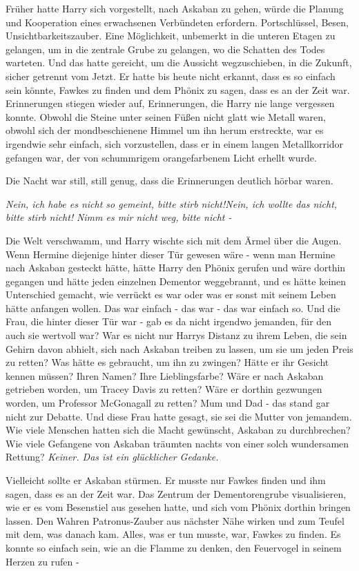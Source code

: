 Früher hatte Harry sich vorgestellt, nach Askaban zu gehen, würde die Planung
und Kooperation eines erwachsenen Verbündeten erfordern. Portschlüssel, Besen,
Unsichtbarkeitszauber. Eine Möglichkeit, unbemerkt in die unteren Etagen zu
gelangen, um in die zentrale Grube zu gelangen, wo die Schatten des Todes
warteten. Und das hatte gereicht, um die Aussicht wegzuschieben, in die Zukunft,
sicher getrennt vom Jetzt. Er hatte bis heute nicht erkannt, dass es so einfach
sein könnte, Fawkes zu finden und dem Phönix zu sagen, dass es an der Zeit war.
Erinnerungen stiegen wieder auf, Erinnerungen, die Harry nie lange vergessen
konnte. Obwohl die Steine unter seinen Füßen nicht glatt wie Metall waren,
obwohl sich der mondbeschienene Himmel um ihn herum erstreckte, war es irgendwie
sehr einfach, sich vorzustellen, dass er in einem langen Metallkorridor gefangen
war, der von schummrigem orangefarbenem Licht erhellt wurde.

Die Nacht war still, still genug, dass die Erinnerungen deutlich hörbar waren.

\emph{Nein, ich habe es nicht so gemeint, bitte stirb nicht!}\emph{Nein, ich
wollte das nicht, bitte stirb nicht!} \emph{Nimm es mir nicht weg, bitte nicht
-}

Die Welt verschwamm, und Harry wischte sich mit dem Ärmel über die Augen. Wenn
Hermine diejenige hinter dieser Tür gewesen wäre - wenn man Hermine nach Askaban
gesteckt hätte, hätte Harry den Phönix gerufen und wäre dorthin gegangen und
hätte jeden einzelnen Dementor weggebrannt, und es hätte keinen Unterschied
gemacht, wie verrückt es war oder was er sonst mit seinem Leben hätte anfangen
wollen. Das war einfach - das war - das war einfach so. Und die Frau, die hinter
dieser Tür war - gab es da nicht irgendwo jemanden, für den auch sie wertvoll
war? War es nicht nur Harrys Distanz zu ihrem Leben, die sein Gehirn davon
abhielt, sich nach Askaban treiben zu lassen, um sie um jeden Preis zu retten?
Was hätte es gebraucht, um ihn zu zwingen? Hätte er ihr Gesicht kennen müssen?
Ihren Namen? Ihre Lieblingsfarbe? Wäre er nach Askaban getrieben worden, um
Tracey Davis zu retten? Wäre er dorthin gezwungen worden, um Professor
McGonagall zu retten? Mum und Dad - das stand gar nicht zur Debatte. Und diese
Frau hatte gesagt, sie sei die Mutter von jemandem. Wie viele Menschen hatten
sich die Macht gewünscht, Askaban zu durchbrechen? Wie viele Gefangene von
Askaban träumten nachts von einer solch wundersamen Rettung?\emph{ Keiner. Das
ist ein glücklicher Gedanke.}

Vielleicht sollte er Askaban stürmen. Er musste nur Fawkes finden und ihm sagen,
dass es an der Zeit war. Das Zentrum der Dementorengrube visualisieren, wie er
es vom Besenstiel aus gesehen hatte, und sich vom Phönix dorthin bringen lassen.
Den Wahren Patronus-Zauber aus nächster Nähe wirken und zum Teufel mit dem, was
danach kam. Alles, was er tun musste, war, Fawkes zu finden. Es konnte so
einfach sein, wie an die Flamme zu denken, den Feuervogel in seinem Herzen zu
rufen -

